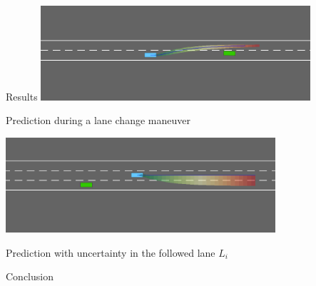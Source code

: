 \documentclass[slideopt,A4,showboxes,svgnames]{beamer}
\begin{document}
\begin{frame}{Results}
\centering
\vspace*{\baselineskip}
\includegraphics[width=0.75\textwidth]{../img/lane_change_predictor.png}

Prediction during a lane change maneuver

\includegraphics[width=0.75\textwidth]{../img/overtake.png}

Prediction with uncertainty in the followed lane $L_i$
\end{frame}

\begin{frame}{Conclusion}
 
\end{frame}
\end{document}
